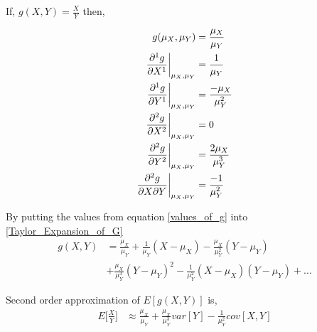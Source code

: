 \documentclass[10pt,twocolumn,letterpaper]{article}
\newcommand{\ignore}[1]{}
\begin{document}
If, \( g(X, Y) = \frac{X}{Y} \) then,

\begin{subequations}
\label{values_of_g}
\begin{align}
   g(\mu_X,\mu_Y) &= \frac{\mu_X}{\mu_Y} \\
   \pdv[1]{g}{X}\bigg|_{\mu_X,\mu_Y} \ignore{& = \frac{1}{Y}\bigg|_{\mu_X,\mu_Y} \\ &} &= \frac{1}{\mu_Y} \\
   \pdv[1]{g}{Y}\bigg|_{\mu_X,\mu_Y} \ignore{&= \frac{(0)(Y) - (1)(X)}{Y^2}\bigg|_{\mu_X,\mu_Y}\\ &} &= \frac{-\mu_X}{\mu_Y^2} \\
   \pdv[2]{g}{X}\bigg|_{\mu_X,\mu_Y} &= 0 \\
   \pdv[2]{g}{Y}\bigg|_{\mu_X,\mu_Y} \ignore{& = \frac{(0)(Y)-(2Y)(-X)}{Y^4}\bigg|_{\mu_X,\mu_Y}\\ &} &= \frac{2\mu_X}{\mu_Y^3} \\
   \pdv[]{g}{X}{Y}\bigg|_{\mu_X,\mu_Y} \ignore{& = \frac{(0)(Y)-(1)(1)}{Y^2}\bigg|_{\mu_X,\mu_Y}\\ &} &= \frac{-1}{\mu_Y^2} 
\end{align}
\end{subequations}

By putting the values from equation \ref{values_of_g} into \ref{Taylor_Expansion_of_G}
\begin{equation}
\begin{split}
   g(X,Y) &= \frac{\mu_X}{\mu_Y} +  \frac{1}{\mu_Y} (X-\mu_X) - \frac{\mu_X}{\mu_Y^2}(Y-\mu_Y) \\ & + \frac{\mu_X}{\mu_Y^3} (Y-\mu_Y)^2 - \frac{1}{\mu_Y^2} (X-\mu_X)(Y-\mu_Y)  + ...
\end{split}
\end{equation}

Second order approximation of \(E[g(X,Y)]\) is,
\begin{equation}
\begin{split}
   E\bigg[\frac{X}{Y}\bigg] &\approx \ignore{\frac{\mu_X}{\mu_Y} + \frac{1}{\mu_Y} E[X-\mu_X]  - \frac{\mu_X}{\mu_Y^2} E[Y-\mu_Y] \\ & + \frac{\mu_X}{\mu_Y^3} E[(Y-\mu_Y)^2] - \frac{1}{\mu_Y^2} E[(X-\mu_X)(Y-\mu_Y)] \\ &=} \frac{\mu_X}{\mu_Y} + \frac{\mu_X}{\mu_Y^3} var[Y]  - \frac{1}{\mu_Y^2} cov[X,Y]
\end{split}
\end{equation}
\end{document}
